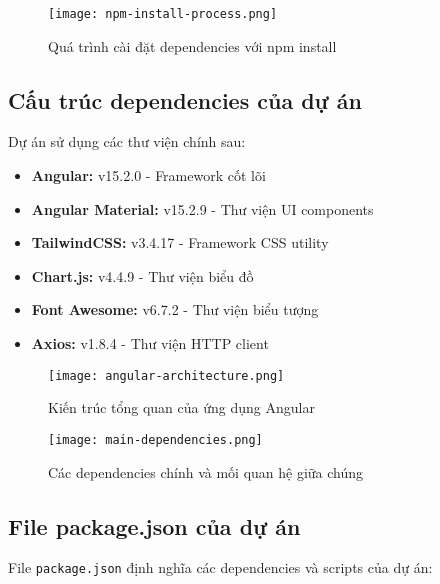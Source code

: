 \documentclass[12pt,a4paper]{article}
\begin{document}
\begin{figure}[h]
\centering
\texttt{[image: npm-install-process.png]}
\caption{Quá trình cài đặt dependencies với npm install}
\end{figure}

\subsection{Cấu trúc dependencies của dự án}

Dự án sử dụng các thư viện chính sau:

\begin{tcolorbox}[colback=green!5,colframe=green!40!black,title=Dependencies chính]
\begin{itemize}
  \item \textbf{Angular:} v15.2.0 - Framework cốt lõi
  \item \textbf{Angular Material:} v15.2.9 - Thư viện UI components
  \item \textbf{TailwindCSS:} v3.4.17 - Framework CSS utility
  \item \textbf{Chart.js:} v4.4.9 - Thư viện biểu đồ
  \item \textbf{Font Awesome:} v6.7.2 - Thư viện biểu tượng
  \item \textbf{Axios:} v1.8.4 - Thư viện HTTP client
\end{itemize}
\end{tcolorbox}

\begin{figure}[h]
\centering
\texttt{[image: angular-architecture.png]}
\caption{Kiến trúc tổng quan của ứng dụng Angular}
\end{figure}

\begin{figure}[h]
\centering
\texttt{[image: main-dependencies.png]}
\caption{Các dependencies chính và mối quan hệ giữa chúng}
\end{figure}

\subsection{File package.json của dự án}

File \texttt{package.json} định nghĩa các dependencies và scripts của dự án:
\end{document}
